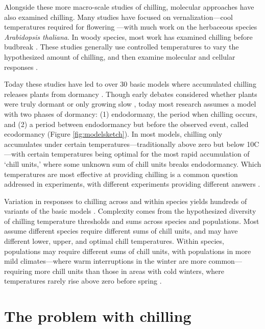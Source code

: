 \documentclass[11pt]{article}
\begin{document}
Alongside these more macro-scale studies of chilling, molecular approaches have also examined chilling. Many studies have focused on vernalization---cool temperatures required for flowering \citep{kim2009vernalization}---with much work on the herbaceous species \emph{Arabidopsis thaliana}. In woody species, most work has examined chilling before budbreak \citep[][]{azeez2021early,cai2024molecular}. These studies generally use controlled temperatures to vary the hypothesized amount of chilling, and then examine molecular and cellular responses \citep[e.g.,][and see Fig. \ref{fig:modelsketch}]{pan2021aba,azeez2021early,cai2024molecular}.

Today these studies have led to over 30 basic models where accumulated chilling releases plants from dormancy \citep[][]{basler2016evaluating,hufkens2018integrated}. Though early debates considered whether plants were truly dormant or only growing slow \citep[`dormancy' or `rest' versus `quiescence';][]{considine2016language}, today most research assumes a model with two phases of dormancy: (1) endodormany, the period when chilling occurs, and (2) a period between endodormancy but before the observed event, called  ecodormancy (Figure \ref{fig:modelsketch}).  In most models, chilling only accumulates under certain temperatures---traditionally above zero but below 10\degree C---with certain temperatures 
being optimal for the most rapid accumulation of `chill units,' where some unknown sum of chill units breaks endodormancy. Which temperatures are most effective at providing chilling is a common question addressed in experiments, with different experiments providing different answers \citep{vitasselev,baum2021}. 

Variation in responses to chilling across and within species yields hundreds of variants of the basic models \citep[][]{basler2016evaluating,hufkens2018integrated}. Complexity comes from the hypothesized diversity of chilling temperature thresholds and sums across species and populations. Most assume different species require different sums of chill units, and may have different lower, upper, and optimal chill temperatures. Within species, populations may require different sums of chill units, with populations in more mild climates---where warm interruptions in the winter are more common---requiring more chill units than those in areas with cold winters, where temperatures rarely rise above zero before spring \citep{campbell1979,leinonen1996dependence}.  


\section*{The problem with chilling}
\end{document}
